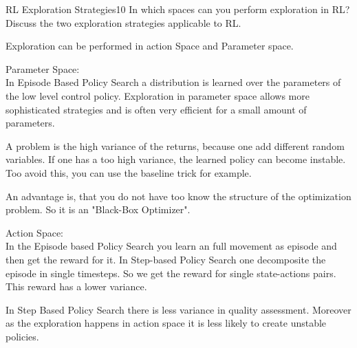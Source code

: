 
\begin{questions}
	

\begin{question}{RL Exploration Strategies}{10}
	In which spaces can you perform exploration in RL? Discuss the two  exploration strategies applicable to RL.
	
\begin{answer}
Exploration can be performed in action Space and Parameter space.

Parameter Space:\\
In Episode Based Policy Search a distribution is learned over the parameters of the low level control policy. Exploration in parameter space allows more sophisticated strategies and is often very efficient for a small amount of parameters. 

A problem is the high variance of the returns, because one add different random variables. If one has a too high variance, the learned policy can become instable. Too avoid this, you can use the baseline trick for example.

An advantage is, that you do not have too know the structure of the optimization problem. So it is an "Black-Box Optimizer".

Action Space:\\
In the Episode based Policy Search you learn an full movement as episode and then get the reward for it. In Step-based Policy Search one decomposite the episode in single timesteps. So we get the reward for single state-actions pairs. This reward has a lower variance.

In Step Based Policy Search there is less variance in quality assessment. Moreover as the exploration happens in action space it is less likely to create unstable policies.
\end{answer}
\end{question}




\end{questions}